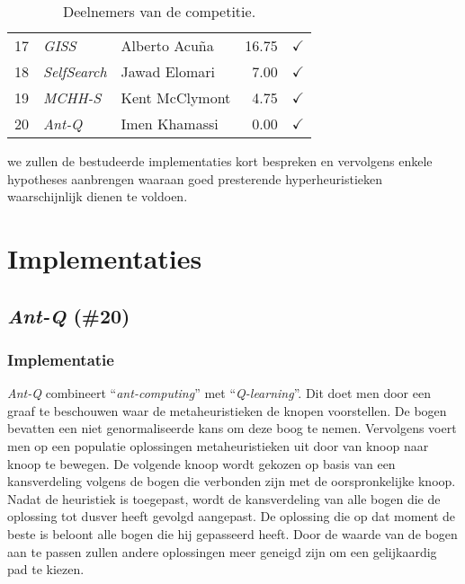 \begin{table}[hbt]
\begin{tabular}{rllrc}
    17&	\emph{GISS}\cite{chesc-giss}&					Alberto Acu\~na&	16.75&	$\checkmark$\\
    18&	\emph{SelfSearch}\cite{chesc-selfsearch}&			Jawad Elomari&		7.00&	$\checkmark$\\
    19&	\emph{MCHH-S}\cite{chesc-mchh-s,conf/gecco/McClymontK11}&	Kent McClymont&		4.75&	$\checkmark$\\
    20&	\emph{Ant-Q}\cite{chesc-ant-q,sis/ant-q}&			Imen Khamassi&		0.00&	$\checkmark$\\
    \bottomrule
  \end{tabular}
  \caption{Deelnemers van de \abchescy{} competitie\cite{chesc-results}.}
  \label{tbl:chescParticipants}
\end{table}

we zullen de bestudeerde implementaties kort bespreken en vervolgens enkele hypotheses aanbrengen waaraan goed presterende hyperheuristieken waarschijnlijk dienen te voldoen.

\section{Implementaties}

\subsection{\emph{Ant-Q} (\#20)}
\label{sss:ant-q}
\subsubsection{Implementatie}
\emph{Ant-Q}\cite{chesc-ant-q,sis/ant-q} combineert ``\emph{ant-computing}''\cite{Michael:2009:AC:1596832.1596835} met ``\emph{Q-learning}''\cite{citeulike:5925674}. Dit doet men door een graaf te beschouwen waar de metaheuristieken de knopen voorstellen. De bogen bevatten een niet genormaliseerde kans om deze boog te nemen. Vervolgens voert men op een populatie oplossingen metaheuristieken uit door van knoop naar knoop te bewegen. De volgende knoop wordt gekozen op basis van een kansverdeling volgens de bogen die verbonden zijn met de oorspronkelijke knoop. Nadat de heuristiek is toegepast, wordt de kansverdeling van alle bogen die de oplossing tot dusver heeft gevolgd aangepast. De oplossing die op dat moment de beste is beloont alle bogen die hij gepasseerd heeft. Door de waarde van de bogen aan te passen zullen andere oplossingen meer geneigd zijn om een gelijkaardig pad te kiezen.
